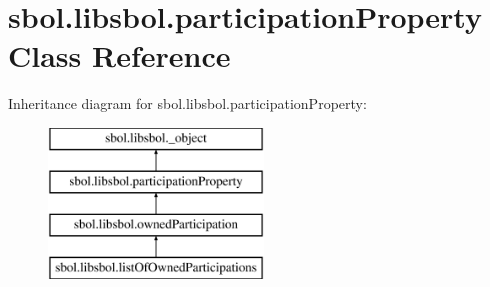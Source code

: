 \hypertarget{classsbol_1_1libsbol_1_1participation_property}{}\section{sbol.\+libsbol.\+participation\+Property Class Reference}
\label{classsbol_1_1libsbol_1_1participation_property}
Inheritance diagram for sbol.\+libsbol.\+participation\+Property\+:\begin{figure}[H]
\begin{center}
\leavevmode
\includegraphics[height=4.000000cm]{classsbol_1_1libsbol_1_1participation_property}
\end{center}
\end{figure}
